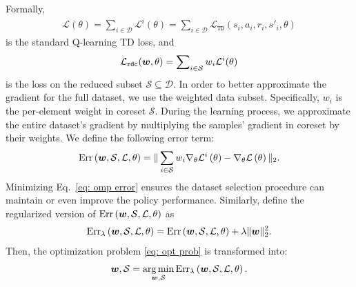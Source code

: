 Formally, 
\begin{align}
    \mathcal L(\theta)=\sum_{i \in \mathcal{D}}\mathcal L^i(\theta) = \sum_{i \in \mathcal{D}}\mathcal L_{\mathtt{TD}}(s_{i}, a_{i}, r_i, s'_{i}, \theta)
\end{align}
is the standard Q-learning TD loss, and
\begin{align}
\mathcal L_{\mathtt{rdc}}({\bm{w}},\theta) = \sum\nolimits_{i \in \mathcal{S}} w_i\mathcal L^i(\theta)
\end{align}
is the loss on the reduced subset $\mathcal{S} \subseteq \mathcal{D}$.
In order to better approximate the gradient for the full dataset, we use the weighted data subset. Specifically, $w_i$ is the per-element weight in coreset $\mathcal{S}$. During the learning process, we approximate the entire dataset's gradient by multiplying the samples' gradient in coreset by their weights.
We define the following error term:
\begin{align}
   \operatorname{Err}\left({\bm{w}}, \mathcal{S}, \mathcal L, \theta\right) =  \| \sum_{i\in \mathcal{S}}w_{i}\nabla_{\theta}\mathcal L^i\left(\theta\right) - \nabla_{\theta} \mathcal L\left(\theta\right)\|_2.
   \label{eq: omp error}
\end{align}
Minimizing Eq.~\ref{eq: omp error} ensures the dataset selection procedure can maintain or even improve the policy performance.
Similarly, define the regularized version of $\operatorname{Err}\left({\bm{w}}, \mathcal{S}, \mathcal L, \theta\right)$ as
\begin{align}
    \operatorname{Err}_{\lambda}\left({\bm{w}}, \mathcal{S}, \mathcal L, \theta\right) =
    \operatorname{Err}\left({\bm{w}}, \mathcal{S}, \mathcal L, \theta\right) + \lambda \|{\bm{w}}\|_2^2.
\label{eq: regular opt prob}
\end{align}
Then, the optimization problem \ref{eq: opt prob} is transformed into:
\begin{align}
{\bm{w}}, \mathcal S= \mathop{\arg\min}\limits_{{\bm{w}}, \mathcal{S}}\operatorname{Err}_{\lambda}\left({\bm{w}}, \mathcal{S}, \mathcal L, \theta\right).
\label{eq: gradient approx}
\end{align}




